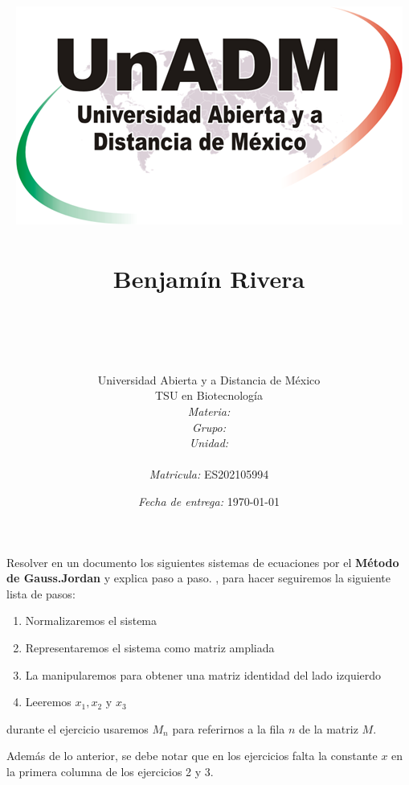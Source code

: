 \documentclass[11pt]{article}
\title{
	\includegraphics{../../../assets/logo-unadm} \\
	\ \\ Benjam\'in Rivera \\
	\bf{\titulo}\\\ \\}
\author{
	Universidad Abierta y a Distancia de México \\
	TSU en Biotecnolog\'ia \\
	\textit{Materia:} \materia \\
	\textit{Grupo:} \grupo \\
	\textit{Unidad:} \unidad \\
	\\
	\textit{Matricula:} ES202105994 }
\date{\textit{Fecha de entrega:} \today}
\begin{document}
\maketitle\newpage

	\par Resolver en un documento los siguientes sistemas de ecuaciones por el \textbf{Método de Gauss.Jordan} y explica paso a paso. , para hacer seguiremos la siguiente lista de pasos:
	\begin{enumerate}
		\item Normalizaremos el sistema
		\item Representaremos el sistema como matriz ampliada
		\item La manipularemos para obtener una matriz identidad del lado izquierdo 
		\item Leeremos $x_1, x_2 \text{ y } x_3$
	\end{enumerate}
	
	durante el ejercicio usaremos $M_n$ para referirnos a la fila $n$ de la matriz $M$.
	
	\par Adem\'as de lo anterior, se debe notar que en los ejercicios falta la constante $x$ en la primera columna de los ejercicios 2 y 3.
\end{document}
